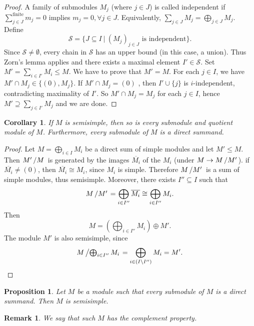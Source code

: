 \documentclass[10pt, a4paper]{article}
\newtheorem{corollary}[thm]{Corollary}
\newtheorem{proposition}[thm]{Proposition}
\newtheorem*{remark}{Remark}
\newenvironment{noticeC}{%
  \tcolorbox[%
  notitle,
  empty,
  enhanced,  %
  breakable,
  coltext=black, 
  fontupper=\rmfamily,
  noparskip,
  sharp corners,
  boxrule=-1pt,  %
  frame hidden,
  left=7pt,  %
  right=7pt,
  top=5pt,
  bottom=5pt,
  before skip=2.5ex plus 2pt,
  after skip=2.5ex plus 2pt,
  overlay unbroken and last={%
  },
  ]}
{\endtcolorbox}
\newenvironment{myproof}%
  {\begin{noticeC}\begin{proof}}%
  {\end{proof}\end{noticeC}}
\newcommand{\quot}[2]{{\raisebox{0em}{$#1$}\left/\raisebox{0em}{$#2$}\right.}}
\begin{document}
\begin{myproof}
  A family of submodules $M_j$ (where $j \in J$) is called independent 
  if $\sum_{j \in J} ^{\textrm{finite}} m_j = 0$ implies $m_j = 0, \forall j \in J$.
  Equivalently, $\sum_{j \in J} M_j = \bigoplus_{j \in J} M_j$.
  Define 
  $$\mathcal{S} = \{J \subseteq I\ |\ \textrm{$(M_j)_{j \in J}$ is independent}\}.$$
  Since $\mathcal{S} \neq \emptyset$, every chain in $\mathcal{S}$ has an upper bound (in this case, a union).
  Thus Zorn's lemma applies and there exists a maximal element $I' \in \mathcal{S}$.
  Set $M' = \sum_{i \in I'} M_i \leq M$. We have to prove that $M' = M$.
  For each $j \in I$, we have $M' \cap M_j \in \{(0), M_j\}$.
  If $M' \cap M_j = (0)$ , then $I' \cup \{j\}$
  is $i$-independent, contradicting maximality of $I'$.
  So $M' \cap M_j = M_j$ for each $j \in I$, hence $M' \supseteq \sum_{j \in I'} M_j$ and we are done.
\end{myproof}

\begin{corollary}
  If $M$ is semisimple, then so is every submodule and quotient module of $M$.
  Furthermore, every submodule of $M$ is a direct summand.
\end{corollary}

\begin{myproof}
  Let $M = \bigoplus_{i \in I} M_i$ be a direct sum of simple modules and let $M' \leq M$.
  Then $\quot{M'}{M}$ is generated by the images $\overline{M_i}$ of the $M_i$ (under $M \to \quot{M}{M'}$).
  if $\overline{M_i} \neq (0)$, then $\overline{M_i} \cong M_i$, since $M_i$ is simple.
  Therefore $\quot{M}{M'}$ is a sum of simple modules, thus semisimple.
  Moreover, there exists $I'' \subseteq I$ such that 
  $$\quot{M}{M'} = \bigoplus_{i \in I''} \overline{M_i} \cong \bigoplus_{i \in I''} M_i.$$
  Then $$M = \left(\bigoplus_{i \in I''} M_i\right) \oplus M'.$$
  The module $M'$ is also semisimple, since 
  \begin{equation*}
    \quot{M}{\bigoplus_{i \in I''} M_i} = \bigoplus_{i \in (I \setminus I'')} M_i = M'.\qedhere
  \end{equation*}
\end{myproof}

\begin{proposition}
  Let $M$ be a module such that every submodule of $M$ is a direct summand. Then $M$ is semisimple.
\end{proposition}

\begin{remark}
  We say that such $M$ has the complement property.
\end{remark}
\end{document}
